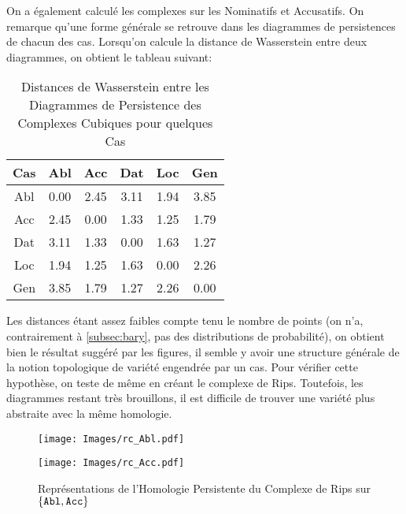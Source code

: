 \documentclass{article}
\begin{document}
On a également calculé les complexes sur les Nominatifs et Accusatifs. On remarque qu'une forme générale se retrouve dans les diagrammes de persistences de chacun des cas.
Lorsqu'on calcule la distance de Wasserstein entre deux diagrammes, on obtient le tableau suivant:

\begin{table}[h]
\centering
\begin{tabular}{c|ccccc}
        \toprule
        Cas & Abl & Acc & Dat & Loc & Gen\\
        \midrule
        Abl & 0.00 & 2.45 & 3.11 & 1.94 & 3.85\\
        Acc & 2.45 & 0.00 & 1.33 & 1.25 & 1.79\\
        Dat & 3.11 & 1.33 & 0.00 & 1.63 & 1.27\\
        Loc & 1.94 & 1.25 & 1.63 & 0.00 & 2.26\\
        Gen & 3.85 & 1.79 & 1.27 & 2.26 & 0.00\\
        \bottomrule
\end{tabular}
\caption{Distances de Wasserstein entre les Diagrammes de Persistence des Complexes Cubiques pour quelques Cas}
\end{table}

Les distances étant assez faibles compte tenu le nombre de points (on n'a, contrairement à \ref{subsec:bary}, pas des distributions de probabilité), on obtient bien le résultat suggéré par les figures, il semble y avoir une structure générale de la notion topologique de variété engendrée par un cas.
Pour vérifier cette hypothèse, on teste de même en créant le complexe de Rips.
Toutefois, les diagrammes restant très brouillons, il est difficile de trouver une variété plus abstraite avec la même homologie.

\begin{figure}[h]
\begin{minipage}{.5\textwidth}
        \begin{center}
        \texttt{[image: Images/rc\_Abl.pdf]}
        \end{center}
\end{minipage}
\begin{minipage}{.5\textwidth}
        \begin{center}
        \texttt{[image: Images/rc\_Acc.pdf]}
        \end{center}
\end{minipage}
\caption{Représentations de l'Homologie Persistente du Complexe de Rips sur $\{\tt Abl,Acc\}$}
\end{figure}
\end{document}
